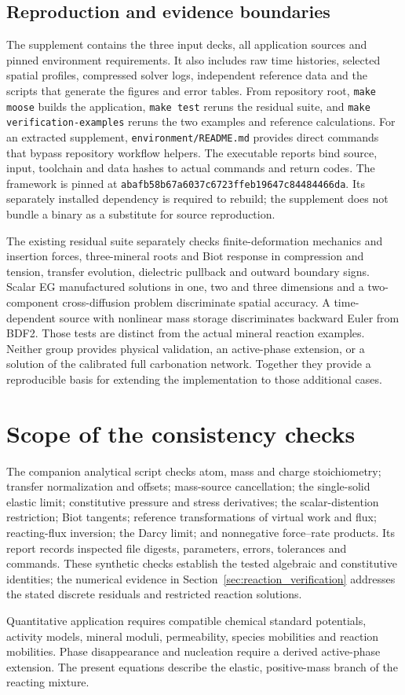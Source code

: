 \documentclass[11pt]{article}
\begin{document}
\subsection{Reproduction and evidence boundaries}
The supplement contains the three input decks, all application sources and pinned environment requirements. It also includes raw time histories, selected spatial profiles, compressed solver logs, independent reference data and the scripts that generate the figures and error tables. From repository root, \texttt{make moose} builds the application, \texttt{make test} reruns the residual suite, and \texttt{make verification-examples} reruns the two examples and reference calculations. For an extracted supplement, \texttt{environment/README.md} provides direct commands that bypass repository workflow helpers. The executable reports bind source, input, toolchain and data hashes to actual commands and return codes. The framework is pinned at \texttt{abafb58b67a6037c6723ffeb19647c84484466da}. Its separately installed dependency is required to rebuild; the supplement does not bundle a binary as a substitute for source reproduction.

The existing residual suite separately checks finite-deformation mechanics and insertion forces, three-mineral roots and Biot response in compression and tension, transfer evolution, dielectric pullback and outward boundary signs. Scalar EG manufactured solutions in one, two and three dimensions and a two-component cross-diffusion problem discriminate spatial accuracy. A time-dependent source with nonlinear mass storage discriminates backward Euler from BDF2. Those tests are distinct from the actual mineral reaction examples. Neither group provides physical validation, an active-phase extension, or a solution of the calibrated full carbonation network. Together they provide a reproducible basis for extending the implementation to those additional cases.

\section{Scope of the consistency checks}
The companion analytical script checks atom, mass and charge stoichiometry; transfer normalization and offsets; mass-source cancellation; the single-solid elastic limit; constitutive pressure and stress derivatives; the scalar-distention restriction; Biot tangents; reference transformations of virtual work and flux; reacting-flux inversion; the Darcy limit; and nonnegative force--rate products. Its report records inspected file digests, parameters, errors, tolerances and commands. These synthetic checks establish the tested algebraic and constitutive identities; the numerical evidence in Section~\ref{sec:reaction_verification} addresses the stated discrete residuals and restricted reaction solutions.

Quantitative application requires compatible chemical standard potentials, activity models, mineral moduli, permeability, species mobilities and reaction mobilities. Phase disappearance and nucleation require a derived active-phase extension. The present equations describe the elastic, positive-mass branch of the reacting mixture.



\end{document}

